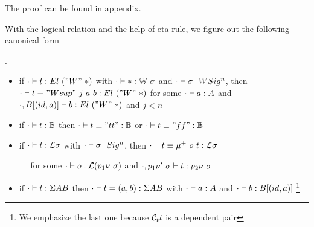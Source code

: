 The proof can be found in appendix.

With the logical relation and the help of eta rule, we figure out the following canonical form
\begin{theorem}.
  \begin{itemize}
    \item if ${ {\cdot} \vdash {t} : {El~("W"~*)} }$ with ${ {\cdot} \vdash {*} : {{\mathbb{W}}~\sigma} }$ and ${ {\cdot} \vdash {\sigma} \ \ WSig^{n} }$, then ${ {\cdot} \vdash {t \equiv "Wsup"~j~a~b} : {El~("W"~*)} }$ for some ${ {\cdot} \vdash {a} : {A} }$ and ${ {\cdot, B[(id, a)]} \vdash {b} : {El~("W"~*)} }$ and $j < n$
    \item if ${ {\cdot} \vdash {t} : {\mathbb{B}} }$ then ${ {\cdot} \vdash {t \equiv "tt"} : {\mathbb{B}} }$ or ${ {\cdot} \vdash {t \equiv "ff"} : {\mathbb{B}} }$ 
    \item if ${ {\cdot} \vdash {t} : {{\mathcal{L}}\sigma} }$ with ${ {\cdot} \vdash {\sigma} \ \ Sig^{n} }$, then ${ {\cdot} \vdash {t \equiv \mu^+~o~t} : {{\mathcal{L}}\sigma} }$ 
    
      $\quad$ for some ${ {\cdot} \vdash {o} : {{\mathcal{L}}(p_1\nu~\sigma)} }$ and ${ {\cdot, p_1\nu'~\sigma} \vdash {t} : {p_2\nu~\sigma} }$
    \item if ${ {\cdot} \vdash {t} : {\Sigma A B} }$ then ${ {\cdot} \vdash {t = (a, b)} : {\Sigma A B} }$ with ${ {\cdot} \vdash {a} : {A} }$ and ${ {\cdot} \vdash {b} : {B[(id, a)]} }$
    \footnote{We emphasize the last one because ${\mathcal{C}_t} t$ is a dependent pair}
  \end{itemize}
\end{theorem}

